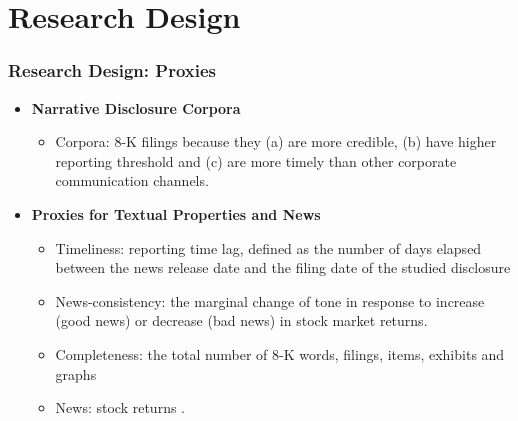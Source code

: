 \documentclass{beamer}
\begin{document}
%
%
\section{Research Design}
\begin{frame}
\frametitle{Research Design: Proxies}
\begin{itemize}

\item \textbf{Narrative Disclosure Corpora}

	\begin{itemize}
		\item Corpora: 8-K filings because they (a) are more credible, (b) have higher reporting threshold and (c) are more timely than other corporate communication channels.
	\end{itemize}

\item \textbf{Proxies for Textual Properties and News}
	\begin{itemize}
		\item Timeliness: reporting time lag, defined as the number of days elapsed between the news release date and the filing date of the studied disclosure
		\item News-consistency: the marginal change of tone in response to increase (good news) or decrease (bad news) in stock market returns.
		\item Completeness: the total number of 8-K words, filings, items, exhibits and graphs
		\item News: stock returns \citep{basuConservatismPrincipleAsymmetric1997}.
	\end{itemize}

\end{itemize}
\end{frame}
\end{document}
